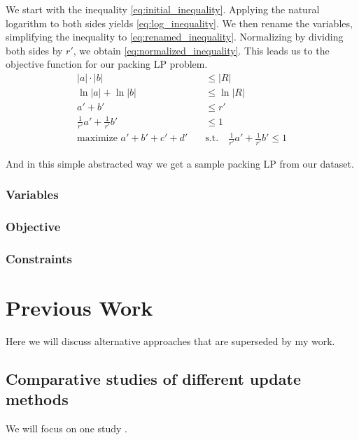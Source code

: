 We start with the inequality \ref{eq:initial_inequality}. Applying the natural logarithm to both sides yields \ref{eq:log_inequality}. We then rename the variables, simplifying the inequality to \ref{eq:renamed_inequality}.
Normalizing by dividing both sides by \(r'\), we obtain \ref{eq:normalized_inequality}. This leads us to the objective function for our packing LP problem.
\begin{align}
    |a| \cdot |b|                            & \leq |R| \label{eq:initial_inequality}                                                   \\
    \ln|a| + \ln|b|                          & \leq \ln|R| \label{eq:log_inequality}                                                    \\
    a' + b'                                  & \leq r' \label{eq:renamed_inequality}                                                    \\
    \frac{1}{r'} a' + \frac{1}{r'} b'        & \leq 1 \label{eq:normalized_inequality}                                                  \\
    \text{maximize } a' + b' + c' + d' \quad & \text{s.t.} \quad \frac{1}{r'} a' + \frac{1}{r'} b' \leq 1 \label{eq:objective_function}
\end{align}

And in this simple abstracted way we get a sample packing LP from our dataset.
\subsubsection{Variables}
\subsubsection{Objective}
\subsubsection{Constraints}

\section{Previous Work}
Here we will discuss alternative approaches that are superseded by my work.
\subsection{Comparative studies of different update methods}
We will focus on one study \parencite{huangfu2015novel}.
